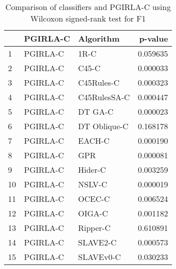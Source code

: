 \begin{table}
\footnotesize
\caption{Comparison of classifiers and PGIRLA-C using Wilcoxon signed-rank test for F1}
\label{tab:PGIRLA-C wilcoxon F1 comparison}
\begin{tabular}{lllr}
\hline
 & PGIRLA-C & Algorithm & p-value \\
\hline
1 & PGIRLA-C & 1R-C & 0.059635 \\
2 & PGIRLA-C & C45-C & 0.000033 \\
3 & PGIRLA-C & C45Rules-C & 0.000323 \\
4 & PGIRLA-C & C45RulesSA-C & 0.000447 \\
5 & PGIRLA-C & DT GA-C & 0.000023 \\
6 & PGIRLA-C & DT Oblique-C & 0.168178 \\
7 & PGIRLA-C & EACH-C & 0.000190 \\
8 & PGIRLA-C & GPR & 0.000081 \\
9 & PGIRLA-C & Hider-C & 0.003259 \\
10 & PGIRLA-C & NSLV-C & 0.000019 \\
11 & PGIRLA-C & OCEC-C & 0.006524 \\
12 & PGIRLA-C & OIGA-C & 0.001182 \\
13 & PGIRLA-C & Ripper-C & 0.610891 \\
14 & PGIRLA-C & SLAVE2-C & 0.000573 \\
15 & PGIRLA-C & SLAVEv0-C & 0.030233 \\
\hline
\end{tabular}
\end{table}

